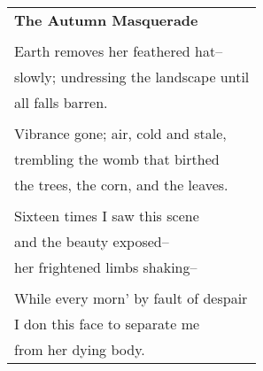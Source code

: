 \documentclass{article}
\begin{document}
\begin{center}
\begin{tabular}{l}
\textbf{The Autumn Masquerade} \\
\\
Earth removes her feathered hat-- \\
slowly; undressing the landscape until \\
all falls barren. \\
\\
Vibrance gone; air, cold and stale, \\
trembling the womb that birthed \\
the trees, the corn, and the leaves. \\
\\
Sixteen times I saw this scene \\
and the beauty exposed-- \\
her frightened limbs shaking-- \\
\\
While every morn' by fault of despair \\
I don this face to separate me \\
from her dying body. \\
\end{tabular}
\end{center}
\end{document}
